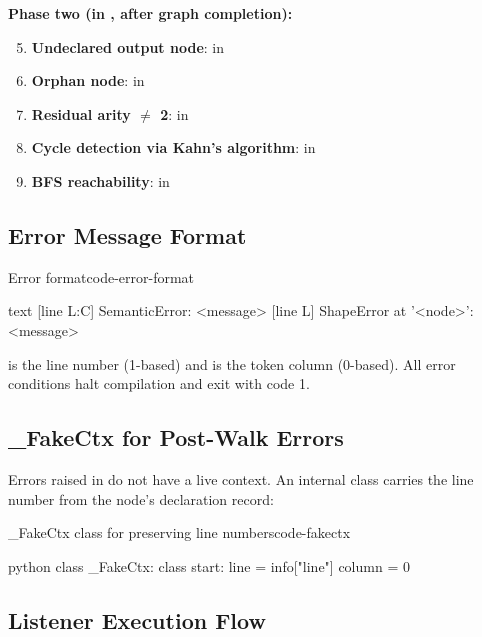 \documentclass{nngraph-en}
\begin{document}
\textbf{Phase two (in , after graph completion):}
\begin{enumerate}
    \setcounter{enumi}{4}
    \item \textbf{Undeclared output node}: in
    \item \textbf{Orphan node}: in 
    \item \textbf{Residual arity $\neq$ 2}: in
    \item \textbf{Cycle detection via Kahn's algorithm}: in
    \item \textbf{BFS reachability}: in 
\end{enumerate}

\subsection{Error Message Format}

\begin{codebox}{Error format}{code-error-format}
\begin{amzcode}{text}
[line L:C] SemanticError: <message>
[line L] ShapeError at '<node>': <message>
\end{amzcode}
\end{codebox}

 is the line number (1-based) and  is the token
column (0-based). All error conditions halt compilation and exit
with code 1.

\subsection{\_FakeCtx for Post-Walk Errors}

Errors raised in  do not have a live context.
An internal class  carries the line number from the
node's declaration record:

\begin{codebox}{\_FakeCtx class for preserving line numbers}{code-fakectx}
\begin{amzcode}{python}
class _FakeCtx:
    class start:
        line   = info["line"]
        column = 0
\end{amzcode}
\end{codebox}

\subsection{Listener Execution Flow}
\end{document}
